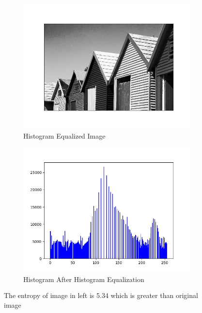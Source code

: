 \documentclass[12pt, a4paper, font = Times New Roman]{article}
\begin{document}
\begin{figure}[!h]
  \begin{subfigure}[b]{0.5\textwidth}
    \includegraphics[width=\textwidth]{equalized_bw.jpeg}
    \caption{Histogram Equalized Image}
    \label{fig:equalized_bw}
  \end{subfigure}
  \hfill
  \begin{subfigure}[b]{0.5\textwidth}
    \includegraphics[width=\textwidth]{equalized_hist.jpeg}
    \caption{Histogram After Histogram Equalization}
    \label{fig:equalized_hist}
  \end{subfigure}
  \caption{The entropy of image in left is 5.34 which is greater than original image}
\end{figure}
\end{document}
